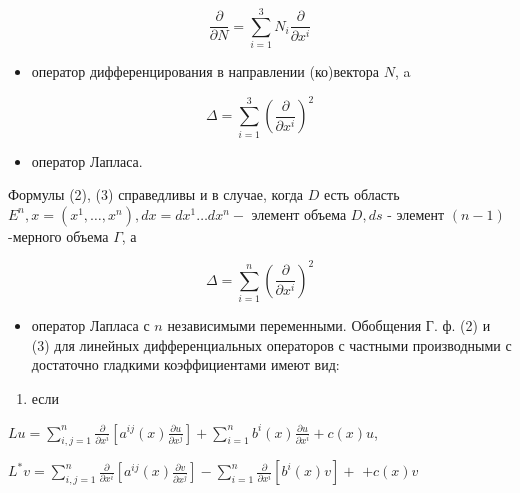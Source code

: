 \documentclass[10pt]{article}
\begin{document}
\[

\frac{\partial}{\partial N}=\sum_{i=1}^{3} N_{i} \frac{\partial}{\partial x^{i}}

\]



\begin{itemize}

  \item оператор дифференцирования в направлении (ко)вектора $N$, a

\end{itemize}



\[

\Delta=\sum_{i=1}^{3}\left(\frac{\partial}{\partial x^{i}}\right)^{2}

\]



\begin{itemize}

  \item оператор Лапласа.

\end{itemize}



Формулы (2), (3) справедливы и в случае, когда $D$ есть область $E^{n}, x=\left(x^{1}, \ldots, x^{n}\right), d x=d x^{1} \ldots d x^{n}-$ элемент объема $D, d s$ - элемент $(n-1)$-мерного объема $\Gamma$, а



\[

\Delta=\sum_{i=1}^{n}\left(\frac{\partial}{\partial x^{i}}\right)^{2}

\]



\begin{itemize}

  \item оператор Лапласа с $n$ независимыми переменными. Обобщения Г. ф. (2) и (3) для линейных дифференциальных операторов с частными производными с достаточно гладкими коэффициентами имеют вид:

\end{itemize}



\begin{enumerate}

  \item если

\end{enumerate}



$L u=\sum_{i, j=1}^{n} \frac{\partial}{\partial x^{i}}\left[a^{i j}(x) \frac{\partial u}{\partial x^{j}}\right]+\sum_{i=1}^{n} b^{i}(x) \frac{\partial u}{\partial x^{i}}+c(x) u$,



$L^{*} v=\sum_{i, j=1}^{n} \frac{\partial}{\partial x^{i}}\left[a^{i j}(x) \frac{\partial v}{\partial x^{j}}\right]-\sum_{i=1}^{n} \frac{\partial}{\partial x^{i}}\left[b^{i}(x) v\right]+$ $+c(x) v$
\end{document}
